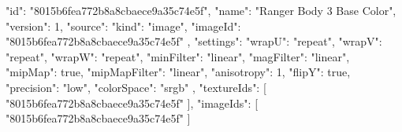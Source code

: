{
  "id": "8015b6fea772b8a8cbaece9a35c74e5f",
  "name": "Ranger Body 3 Base Color",
  "version": 1,
  "source": {
    "kind": "image",
    "imageId": "8015b6fea772b8a8cbaece9a35c74e5f"
  },
  "settings": {
    "wrapU": "repeat",
    "wrapV": "repeat",
    "wrapW": "repeat",
    "minFilter": "linear",
    "magFilter": "linear",
    "mipMap": true,
    "mipMapFilter": "linear",
    "anisotropy": 1,
    "flipY": true,
    "precision": "low",
    "colorSpace": "srgb"
  },
  "textureIds": [
    "8015b6fea772b8a8cbaece9a35c74e5f"
  ],
  "imageIds": [
    "8015b6fea772b8a8cbaece9a35c74e5f"
  ]
}
